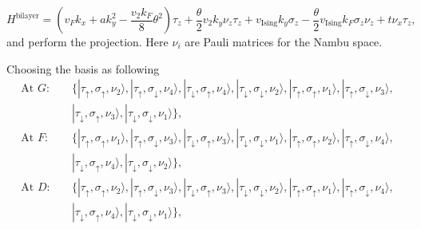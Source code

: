 \begin{subappendices}
	\begin{equation}\label{bilayer Hamiltonian in Nambu}
		H^{\text{bilayer}}=\left(v_F k_x+ak_y^2-\dfrac{v_2 k_F}{8}\theta^2\right)\tau_z+\dfrac{\theta}{2}v_2k_y\nu_z\tau_z+v_{\text{Ising}} k_y\sigma_z-\dfrac{\theta}{2}v_{\text{Ising}} k_F\sigma_z\nu_z+t\nu_x\tau_z,
	\end{equation}
	and perform the projection. Here $\nu_i$ are Pauli matrices for the Nambu space.\par
	Choosing the basis as following
	\begin{align*}
		\text{At }G: & \quad \{|\tau_\uparrow,\sigma_\uparrow,\nu_2\rangle,|\tau_\uparrow,\sigma_\downarrow,\nu_4\rangle,|\tau_\downarrow,\sigma_\uparrow,\nu_4\rangle,|\tau_\downarrow,\sigma_\downarrow,\nu_2\rangle, |\tau_\uparrow,\sigma_\uparrow,\nu_1\rangle,|\tau_\uparrow,\sigma_\downarrow,\nu_3\rangle, \\
		             & \quad|\tau_\downarrow,\sigma_\uparrow,\nu_3\rangle,|\tau_\downarrow,\sigma_\downarrow,\nu_1\rangle\},                                                                                                                                                                                       \\
		\text{At }F: & \quad \{|\tau_\uparrow,\sigma_\uparrow,\nu_1\rangle,|\tau_\uparrow,\sigma_\downarrow,\nu_3\rangle,|\tau_\downarrow,\sigma_\uparrow,\nu_3\rangle,|\tau_\downarrow,\sigma_\downarrow,\nu_1\rangle,|\tau_\uparrow,\sigma_\uparrow,\nu_2\rangle,|\tau_\uparrow,\sigma_\downarrow,\nu_4\rangle,  \\
		             & \quad|\tau_\downarrow,\sigma_\uparrow,\nu_4\rangle,|\tau_\downarrow,\sigma_\downarrow,\nu_2\rangle\},                                                                                                                                                                                       \\
		\text{At }D: & \quad \{|\tau_\uparrow,\sigma_\uparrow,\nu_2\rangle,|\tau_\uparrow,\sigma_\downarrow,\nu_3\rangle,|\tau_\downarrow,\sigma_\uparrow,\nu_3\rangle,|\tau_\downarrow,\sigma_\downarrow,\nu_2\rangle,|\tau_\uparrow,\sigma_\uparrow,\nu_1\rangle,|\tau_\uparrow,\sigma_\downarrow,\nu_4\rangle,  \\
		             & \quad|\tau_\downarrow,\sigma_\uparrow,\nu_4\rangle,|\tau_\downarrow,\sigma_\downarrow,\nu_1\rangle\},                                                                                                                                                                                       \\

\end{align*}
\end{subappendices}
